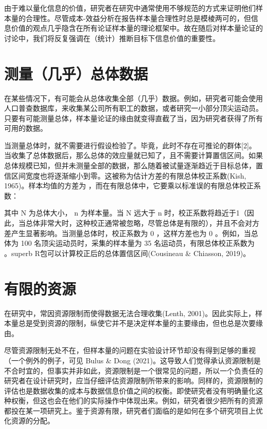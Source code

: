 \documentclass[
  letterpaper,
  DIV=11,
  numbers=noendperiod]{scrreprt}
\begin{document}
由于难以量化信息的价值，研究者在研究中通常使用不够规范的方式来证明他们样本量的合理性。尽管成本-效益分析在报告样本量合理性时总是模棱两可的，但信息价值的观点几乎隐含在所有论证样本量的理论框架中。故在随后对样本量论证的讨论中，我们将反复强调在（统计）推断目标下信息价值的重要性。

\hypertarget{ux6d4bux91cfux51e0ux4e4eux603bux4f53ux6570ux636e}{%
\section{测量（几乎）总体数据}\label{ux6d4bux91cfux51e0ux4e4eux603bux4f53ux6570ux636e}}

在某些情况下，有可能会从总体收集全部（几乎）数据。例如，研究者可能会使用人口普查数据库，来收集某公司所有职工的数据，或者研究一小部分顶尖运动员。只要有可能测量总体，样本量论证的缘由就变得直截了当，因为研究者获得了所有可用的数据。

当测量总体时，就不需要进行假设检验了。毕竟，此时不存在可推论的群体{[}2{]}。当收集了总体数据后，那么总体的效应量就已知了，且不需要计算置信区间。如果总体规模已知，但并未测量全部的数据，那么随着被试量逐渐趋近于目标总体，置信区间宽度也将逐渐缩小到零。这被称为估计方差的有限总体校正系数(Kish,
1965)。样本均值的方差为
，而在有限总体中，它要乘以标准误的有限总体校正系数：

其中 N 为总体大小， n 为样本量。当 N 远大于 n
时，校正系数将趋近于1（因此，当总体非常大时，这种校正通常被忽略，尽管总体是有限的），并且不会对方差产生显著影响。当测量总体时，校正系数为
0 ，这样方差也为 0 。例如，当总体为 100 名顶尖运动员时，采集的样本量为
35 名运动员，有限总体校正系数为 。superb
R包可以计算校正后的总体置信区间(Cousineau \& Chiasson, 2019)。

\hypertarget{ux6709ux9650ux7684ux8d44ux6e90}{%
\section{有限的资源}\label{ux6709ux9650ux7684ux8d44ux6e90}}

在研究中，常因资源限制而使得数据无法合理收集(Lenth,
2001)。因此实际上，样本量总是受到资源的限制，纵使它并不是决定样本量的主要缘由，但也总是次要缘由。

尽管资源限制无处不在，但样本量的问题在实验设计环节却没有得到足够的重视（一个例外的例子，可见
Bulus \& Dong
(2021)。这导致人们觉得承认资源限制是不合时宜的，但事实并非如此，资源限制是一个很常见的问题，所以一个负责任的研究者在设计研究时，应当仔细评估资源限制所带来的影响。同样的，资源限制的评估也是数据收集的成本与数据信息价值之间的权衡。即使研究者没有明确量化这种权衡，但这也会在他们的实际操作中体现出来。例如，研究者很少把所有的资源都投在某一项研究上。鉴于资源有限，研究者们面临的是如何在多个研究项目上优化资源的分配。
\end{document}
